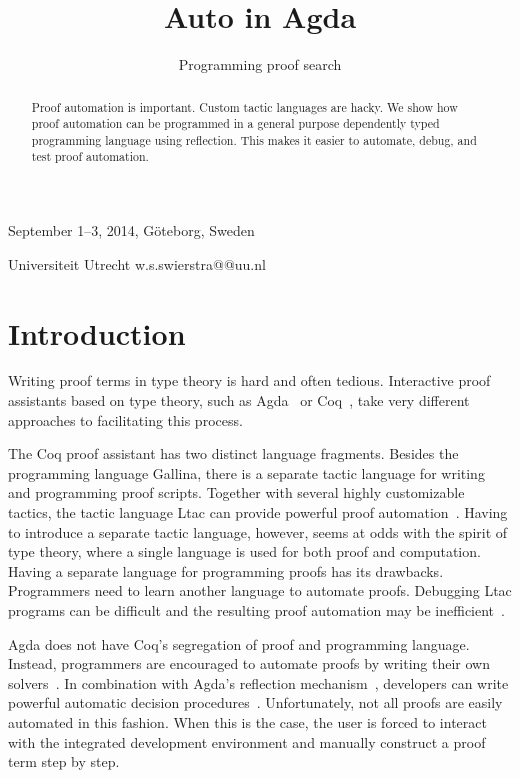 \documentclass[preprint]{sigplanconf}
\begin{document}
 {September 1--3, 2014, G\"oteborg, Sweden}

\title{Auto in Agda}
\subtitle{Programming proof search}

           {Universiteit Utrecht}
           { \quad w.s.swierstra@@uu.nl}

\maketitle


\begin{abstract}
  Proof automation is important. Custom tactic languages are hacky. We
  show how proof automation can be programmed in a general purpose
  dependently typed programming language using reflection. This makes
  it easier to automate, debug, and test proof automation.
\end{abstract}

\section{Introduction}
\label{sec:intro}

Writing proof terms in type theory is hard and often tedious.
Interactive proof assistants based on type theory, such as
Agda~\cite{agda} or Coq~\cite{coq}, take very different approaches to
facilitating this process.

The Coq proof assistant has two distinct language fragments. Besides
the programming language Gallina, there is a separate tactic language
for writing and programming proof scripts. Together with several
highly customizable tactics, the tactic language Ltac can provide
powerful proof automation~\cite{chlipala}. Having to introduce a
separate tactic language, however, seems at odds with the spirit of
type theory, where a single language is used for both proof and
computation.  Having a separate language for programming proofs has
its drawbacks. Programmers need to learn another language to automate
proofs. Debugging Ltac programs can be difficult and the resulting
proof automation may be inefficient~\cite{brabaint}.

Agda does not have Coq's segregation of proof and programming
language.  Instead, programmers are encouraged to automate proofs by
writing their own solvers~\cite{ulf-tphols}. In combination with
Agda's reflection mechanism~\cite{van-der-walt}, developers can write
powerful automatic decision procedures~\cite{allais}. Unfortunately,
not all proofs are easily automated in this fashion. When this is the
case, the user is forced to interact with the integrated development
environment and manually construct a proof term step by step.
\end{document}
